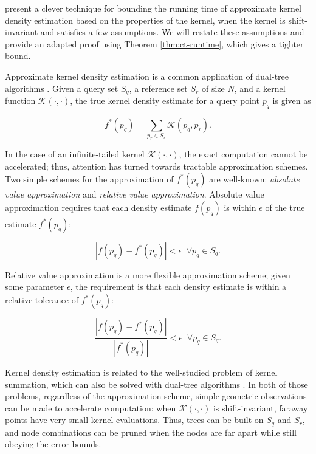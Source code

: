 \citet{ram2009} present a clever technique for bounding the
running time of approximate kernel density estimation based on the properties of
the kernel, when the kernel is shift-invariant and satisfies a few assumptions.
We will restate these assumptions and provide an adapted proof using Theorem
\ref{thm:ct-runtime}, which gives a tighter bound.

Approximate kernel density estimation is a common application of dual-tree
algorithms \citep{gray2003nonparametric, nbody}.  Given a query set $S_q$, a
reference set $S_r$ of size $N$, and a kernel function $\mathcal{K}(\cdot,
\cdot)$, the true kernel density estimate for a query point $p_q$ is given as

\begin{equation}
f^*(p_q) = \sum_{p_r \in S_r} \mathcal{K}(p_q, p_r).
\end{equation}

In the case of an infinite-tailed kernel $\mathcal{K}(\cdot, \cdot)$, the
exact computation cannot be accelerated; thus, attention has turned towards
tractable approximation schemes.  Two simple schemes for the approximation of
$f^*(p_q)$ are well-known: {\it absolute value approximation} and {\it relative
value approximation}.  Absolute value approximation requires that each density
estimate $f(p_q)$ is within $\epsilon$ of the true estimate $f^*(p_q)$:

\begin{equation}
\label{eqn:ava}
| f(p_q) - f^*(p_q) | < \epsilon \; \; \forall p_q \in S_q.
\end{equation}

Relative value approximation is a more flexible approximation scheme; given some
parameter $\epsilon$, the requirement is that each density estimate is within a
relative tolerance of $f^*(p_q):$

\begin{equation}
\label{eqn:rva}
\frac{| f(p_q) - f^*(p_q) |}{| f^*(p_q) |} < \epsilon \; \; \forall p_q \in S_q.
\end{equation}

Kernel density estimation is related to the well-studied problem of kernel
summation, which can also be solved with dual-tree algorithms
\citep{lee2006faster, lee2008fast}.  In both of those problems, regardless of
the approximation scheme, simple geometric observations can be made to
accelerate computation: when $\mathcal{K}(\cdot, \cdot)$ is shift-invariant,
faraway points have very small kernel evaluations.  Thus, trees can be built on
$S_q$ and $S_r$, and node combinations can be pruned when the nodes are far
apart while still obeying the error bounds.

